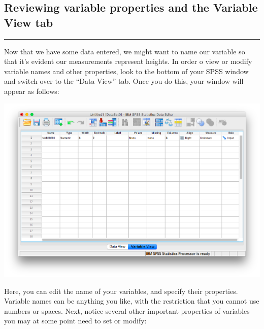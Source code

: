 \documentclass[
]{book}
\begin{document}
\hypertarget{reviewing-variable-properties-and-the-variable-view-tab}{%
\subsection{Reviewing variable properties and the Variable View tab}\label{reviewing-variable-properties-and-the-variable-view-tab}}

\begin{center}\rule{0.5\linewidth}{0.5pt}\end{center}

Now that we have some data entered, we might want to name our variable so that it's evident our measurements represent heights. In order o view or modify variable names and other properties, look to the bottom of your SPSS window and switch over to the ``Data View'' tab. Once you do this, your window will appear as follows:

\includegraphics{img/1.4.13.png}

Here, you can edit the name of your variables, and specify their properties. Variable names can be anything you like, with the restriction that you cannot use numbers or spaces. Next, notice several other important properties of variables you may at some point need to set or modify:
\end{document}
